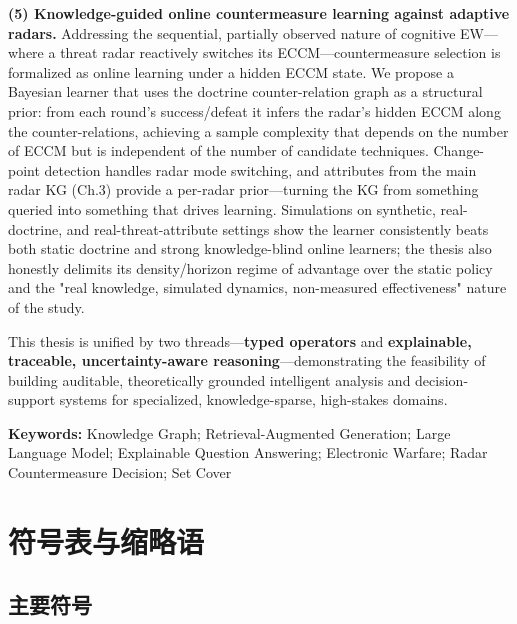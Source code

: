 \documentclass[12pt,a4paper]{ctexart}
\begin{document}
\textbf{(5) Knowledge-guided online countermeasure learning against adaptive radars.} Addressing the sequential, partially observed nature of cognitive EW—where a threat radar reactively switches its ECCM—countermeasure selection is formalized as online learning under a hidden ECCM state. We propose a Bayesian learner that uses the doctrine counter-relation graph as a structural prior: from each round's success/defeat it infers the radar's hidden ECCM along the counter-relations, achieving a sample complexity that depends on the number of ECCM but is independent of the number of candidate techniques. Change-point detection handles radar mode switching, and attributes from the main radar KG (Ch.3) provide a per-radar prior—turning the KG from something queried into something that drives learning. Simulations on synthetic, real-doctrine, and real-threat-attribute settings show the learner consistently beats both static doctrine and strong knowledge-blind online learners; the thesis also honestly delimits its density/horizon regime of advantage over the static policy and the "real knowledge, simulated dynamics, non-measured effectiveness" nature of the study.

This thesis is unified by two threads—\textbf{typed operators} and \textbf{explainable, traceable, uncertainty-aware reasoning}—demonstrating the feasibility of building auditable, theoretically grounded intelligent analysis and decision-support systems for specialized, knowledge-sparse, high-stakes domains.

\textbf{Keywords:} Knowledge Graph; Retrieval-Augmented Generation; Large Language Model; Explainable Question Answering; Electronic Warfare; Radar Countermeasure Decision; Set Cover



\section*{符号表与缩略语}

\subsection*{主要符号}
\end{document}
